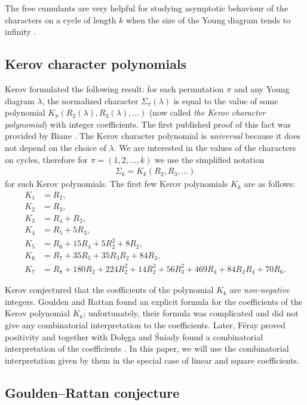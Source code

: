 \documentclass[submission]{FPSAC2021}
\begin{document}
The free cumulants are very helpful for studying
asymptotic behaviour of the characters on a cycle 
of length $k$ when the size of the Young diagram 
tends to infinity \cite{Bia98}.

\subsection{Kerov character polynomials}

Kerov \cite{Ker00} formulated the following result: 
for each permutation $\pi$ and any Young
diagram $\lambda$, the normalized 
character $\Sigma_{\pi}(\lambda)$ is 
equal to the value of some polynomial 
$K_{\pi}(R_2(\lambda), R_3(\lambda), \ldots)$
(now called \emph{the Kerov character polynomial})
with integer coefficients. The first 
published proof of this fact was provided 
by Biane \cite{Bia03}. The Kerov character
polynomial is \emph{universal} because it 
does not depend on the choice of $\lambda$. 
We are interested in the values of the 
characters on cycles, therefore for 
$\pi=(1, 2, \ldots, k)$ we use 
the simplified notation
\begin{align}
\label{kerpol}
\Sigma_k=K_k(R_2, R_3, \ldots)
\end{align}
for such Kerov polynomials. The first few Kerov polynomials $K_k$ are as follows:
\begin{align*}
K_1&=R_2,\\
K_2&=R_3,\\
K_3&=R_4+R_2,\\
K_4&=R_5+5R_3,\\
K_5&=R_6+15R_4+5R_2^2+8R_2,\\
K_6&=R_7+35R_5+35R_3R_2+84R_3, \\
K_7&=R_8+180R_2+224R_2^2+14R_2^3+56R_3^2+469R_4+84R_2R_4+70R_6.
\end{align*}

Kerov conjectured that the coefficients of 
the polynomial $K_k$ are \emph{non-negative} integers.
Goulden and Rattan \cite{GR05} found an explicit 
formula for the coefficients of the Kerov
polynomial $K_k$; unfortunately, their formula 
was complicated and did not give any combinatorial
interpretation to the coefficients. Later, 
F\'{e}ray proved positivity \cite{Fer09} and together 
with Dołęga and Śniady found a combinatorial 
interpretation of the coefficients \cite{DFS10}.
In this paper, we will use the combinatorial
interpretation given by them in the special case 
of linear and square coefficients.


\subsection{Goulden--Rattan conjecture}
\end{document}
